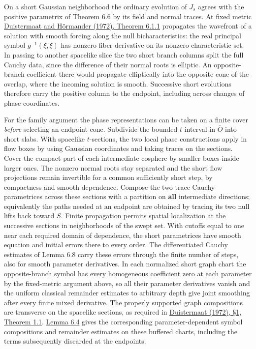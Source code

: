 \documentclass[
  english,
  11pt,
  reqno]{amsart}
\begin{document}
On a short Gaussian neighborhood the ordinary evolution of \(J_s\)
agrees with the positive parametrix of Theorem 6.6 by its field and
normal traces. At fixed metric
\hyperref[ref-DuistermaatHormander1972]{Duistermaat and Hörmander
(1972), Theorem 6.1.1} propagates the wavefront of a solution with
smooth forcing along the null bicharacteristics: the real principal
symbol \(g^{-1}(\xi,\xi)\) has nonzero fiber derivative on its nonzero
characteristic set. In passing to another spacelike slice the two short
branch columns split the full Cauchy data, since the difference of their
normal roots is elliptic. An opposite-branch coefficient there would
propagate elliptically into the opposite cone of the overlap, where the
incoming solution is smooth. Successive short evolutions therefore carry
the positive column to the endpoint, including across changes of phase
coordinates.

For the family argument the phase representations can be taken on a
finite cover \emph{before} selecting an endpoint cone. Subdivide the
bounded \(t\) interval in \(\overline O\) into short slabs. With
spacelike \(t\)-sections, the two local phase constructions apply in
flow boxes by using Gaussian coordinates and taking traces on the
sections. Cover the compact part of each intermediate cosphere by
smaller boxes inside larger ones. The nonzero normal roots stay
separated and the short flow projections remain invertible for a common
sufficiently short step, by compactness and smooth dependence. Compose
the two-trace Cauchy parametrices across these sections with a partition
on \textbf{all} intermediate directions; equivalently the paths needed
at an endpoint are obtained by tracing its two null lifts back toward
\(S\). Finite propagation permits spatial localization at the successive
sections in neighborhoods of the swept set. With cutoffs equal to one
near each required domain of dependence, the short parametrices have
smooth equation and initial errors there to every order. The
differentiated Cauchy estimates of Lemma 6.8 carry these errors through
the finite number of steps, also for smooth parameter derivatives. In
each normalized short graph chart the opposite-branch symbol has every
homogeneous coefficient zero at each parameter by the fixed-metric
argument above, so all their parameter derivatives vanish and the
uniform classical remainder estimates to arbitrary depth give joint
smoothing after every finite mixed derivative. The properly supported
graph compositions are transverse on the spacelike sections, as required
in \hyperref[ref-Duistermaat1972FIO]{Duistermaat (1972), §1, Theorem
1.1}. \hyperref[lem:online-finite-symbol-family-calculus]{Lemma 6.4}
gives the corresponding parameter-dependent symbol compositions and
remainder estimates on these buffered charts, including the terms
subsequently discarded at the endpoints.
\end{document}
